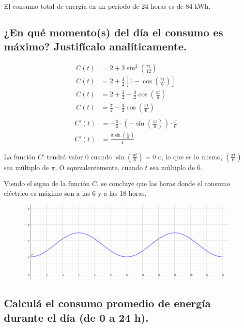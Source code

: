 \documentclass[11pt, a4paper]{article}
\begin{document}
El consumo total de energía en un período de 24 horas es de 84 kWh.

\subsection{¿En qué momento(s) del día el consumo es máximo? Justifícalo analíticamente.
}

\begin{align*}
    C(t) &= 2 + 3\sin^2\left(\frac{\pi t}{12}\right) \\
    C(t) &= 2 + \frac{3}{2}\left[1 - \cos\left(\frac{\pi t}{6}\right)\right] \\
    C(t) &= 2 + \frac{3}{2} - \frac{3}{2}\cos\left(\frac{\pi t}{6}\right) \\
    C(t) &= \frac{7}{2} - \frac{3}{2}\cos\left(\frac{\pi t}{6}\right) \\
\end{align*}
\begin{align*}
    C'(t) &= -\frac{3}{2} \cdot \left(-\sin\left(\frac{\pi t}{6}\right)\right) \cdot \frac{\pi}{6} \\
    C'(t) &= \frac{\pi \sin\left(\frac{\pi t}{6}\right)}{4}
\end{align*}

La función $C'$ tendrá valor 0 cuando $\sin(\frac{\pi t}{6}) = 0$ o, lo que es lo mismo, $(\frac{\pi t}{6})$ sea múltiplo de $\pi$. O equivalentemente, cuando $t$ sea múltiplo de 6.

Viendo el signo de la función $C$, se concluye que las horas donde el consumo eléctrico es máximo son a las 6 y a las 18 horas.

\begin{figure}[h]
	\centering
	\includegraphics[width=0.9\linewidth]{image.png}
\end{figure}

\subsection{Calculá el consumo promedio de energía durante el día (de 0 a 24 h).}
\end{document}

